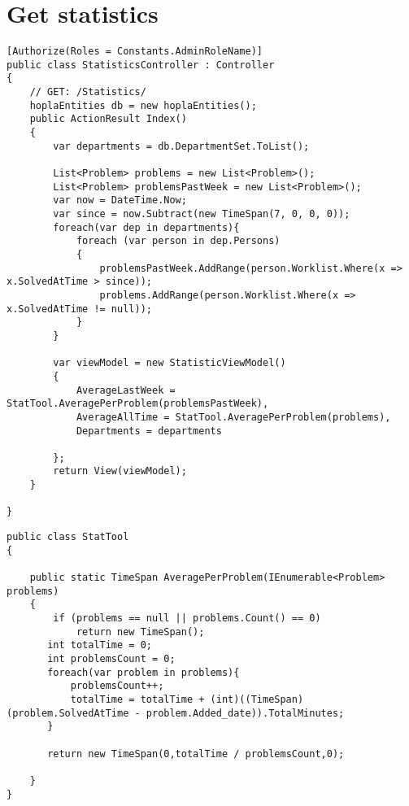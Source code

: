 \section{Get statistics}
\label{sec:getstatistics}




\begin{lstlisting}[style=sourceCode, caption=\myCaption{The StatisticsController controller}, label=lst:getstatistics,float=hp]
[Authorize(Roles = Constants.AdminRoleName)]
public class StatisticsController : Controller
{
    // GET: /Statistics/
    hoplaEntities db = new hoplaEntities();
    public ActionResult Index()
    {
        var departments = db.DepartmentSet.ToList();
        
        List<Problem> problems = new List<Problem>();
        List<Problem> problemsPastWeek = new List<Problem>();
        var now = DateTime.Now;
        var since = now.Subtract(new TimeSpan(7, 0, 0, 0));
        foreach(var dep in departments){
            foreach (var person in dep.Persons)
            {
                problemsPastWeek.AddRange(person.Worklist.Where(x => x.SolvedAtTime > since));
                problems.AddRange(person.Worklist.Where(x => x.SolvedAtTime != null));
            }
        }

        var viewModel = new StatisticViewModel()
        {
            AverageLastWeek = StatTool.AveragePerProblem(problemsPastWeek),
            AverageAllTime = StatTool.AveragePerProblem(problems),
            Departments = departments
            
        };
        return View(viewModel);
    }

}
\end{lstlisting}


\begin{lstlisting}[style=sourceCode, caption=\myCaption{The AveragePerProblem(IEnumerable<Problem> problems) method -- which is found in the \cl{StatTool} class.}, label=lst:averageperproblem,float=hp]
public class StatTool
{
   
    public static TimeSpan AveragePerProblem(IEnumerable<Problem> problems)
    {
        if (problems == null || problems.Count() == 0)
            return new TimeSpan();
       int totalTime = 0; 
       int problemsCount = 0;
       foreach(var problem in problems){
           problemsCount++;
           totalTime = totalTime + (int)((TimeSpan)(problem.SolvedAtTime - problem.Added_date)).TotalMinutes;
       }

       return new TimeSpan(0,totalTime / problemsCount,0);
       
    }
}
\end{lstlisting}

